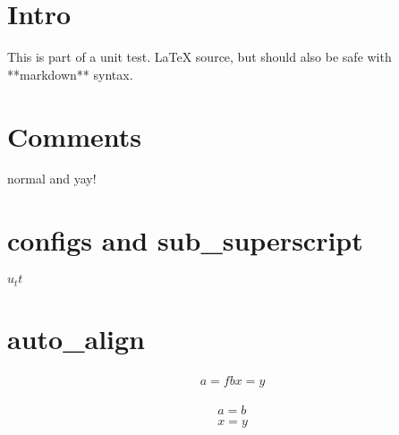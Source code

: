 \documentclass[12pt]{article}
\begin{document}
\section{Intro}
This is part of a unit test. \LaTeX{} source, but should also be safe with **markdown** syntax.

\section{Comments}
normal %
and
yay!

\section{configs and sub_superscript}
$u_tt$

\section{auto_align}
\begin {align}
a = fb
x = y
\end{align}

\begin {align}
a = b \\

x = y
\end{align}
\end{document}
